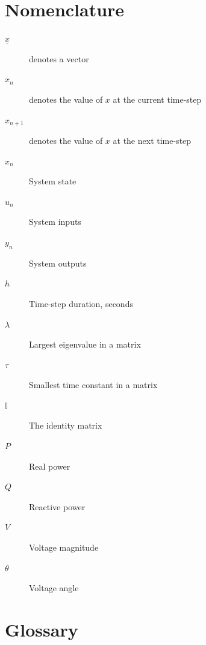 \documentclass[a4paper,oneside,12pt]{report}
\begin{document}
\tableofcontents
\listoffigures
\listoftables

\chapter*{Nomenclature}

\begin{description}
\item [$\underline{x}$] denotes a vector
\item [$x_{n}$] denotes the value of $x$ at the current time-step
\item [$x_{n+1}$] denotes the value of $x$ at the next time-step
\item [$x_n$] System state
\item [$u_n$] System inputs
\item [$y_n$] System outputs
\item [$h$] Time-step duration, seconds
\item [$\lambda$] Largest eigenvalue in a matrix
\item [$\tau$] Smallest time constant in a matrix
\item [$\mathbb{I}$] The identity matrix
\item [$P$] Real power
\item [$Q$] Reactive power
\item [$V$] Voltage magnitude
\item [$\theta$] Voltage angle
\end{description}



\chapter*{Glossary}
\end{document}
